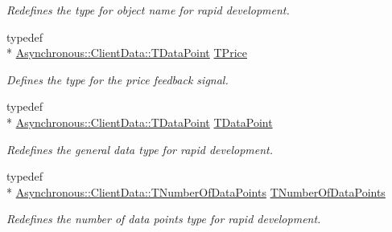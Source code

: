 \begin{DoxyCompactItemize}
\begin{DoxyCompactList}\small\item\em Redefines the type for object name for rapid development. \end{DoxyCompactList}\item 
typedef \\*
\hyperlink{class_terra_swarm_1_1_asynchronous_1_1_client_data_ac733720fed15e940f991de44f1bb514e}{Asynchronous\-::\-Client\-Data\-::\-T\-Data\-Point} \hyperlink{class_control_manager_acad2d80fd0659e3d979389de905e7b5b}{T\-Price}
\begin{DoxyCompactList}\small\item\em Defines the type for the price feedback signal. \end{DoxyCompactList}\item 
typedef \\*
\hyperlink{class_terra_swarm_1_1_asynchronous_1_1_client_data_ac733720fed15e940f991de44f1bb514e}{Asynchronous\-::\-Client\-Data\-::\-T\-Data\-Point} \hyperlink{class_control_manager_a236ef5279ad4f3082443e4c6d300a7d2}{T\-Data\-Point}
\begin{DoxyCompactList}\small\item\em Redefines the general data type for rapid development. \end{DoxyCompactList}\item 
typedef \\*
\hyperlink{class_terra_swarm_1_1_asynchronous_1_1_client_data_a690994afd0ba9b8eeb56ae679a5c64e8}{Asynchronous\-::\-Client\-Data\-::\-T\-Number\-Of\-Data\-Points} \hyperlink{class_control_manager_a90ca5d46699df9c6e67c96e36727eff1}{T\-Number\-Of\-Data\-Points}
\begin{DoxyCompactList}\small\item\em Redefines the number of data points type for rapid development. \end{DoxyCompactList}\end{DoxyCompactItemize}
